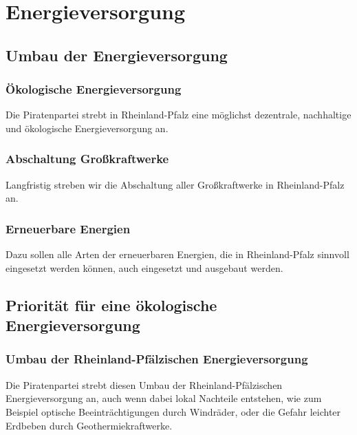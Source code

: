 \section{Energieversorgung}

\subsection*{Umbau der Energieversorgung}


\subsubsection{Ökologische Energieversorgung} 
\abstimmung
Die Piratenpartei strebt in Rheinland-Pfalz eine möglichst dezentrale, nachhaltige und ökologische Energieversorgung an.

\subsubsection{Abschaltung Großkraftwerke}
Langfristig streben wir die Abschaltung aller Großkraftwerke in Rheinland-Pfalz an.

\subsubsection{Erneuerbare Energien}
Dazu sollen alle Arten der erneuerbaren Energien, die in Rheinland-Pfalz sinnvoll eingesetzt werden können, auch eingesetzt und ausgebaut werden.
 
\subsection*{Priorität für eine ökologische Energieversorgung}

\subsubsection{Umbau der Rheinland-Pfälzischen Energieversorgung}
\abstimmung
Die Piratenpartei strebt diesen Umbau der Rheinland-Pfälzischen Energieversorgung an, auch wenn dabei lokal Nachteile entstehen, wie zum Beispiel optische Beeinträchtigungen durch Windräder, oder die Gefahr leichter Erdbeben durch Geothermiekraftwerke.
 
